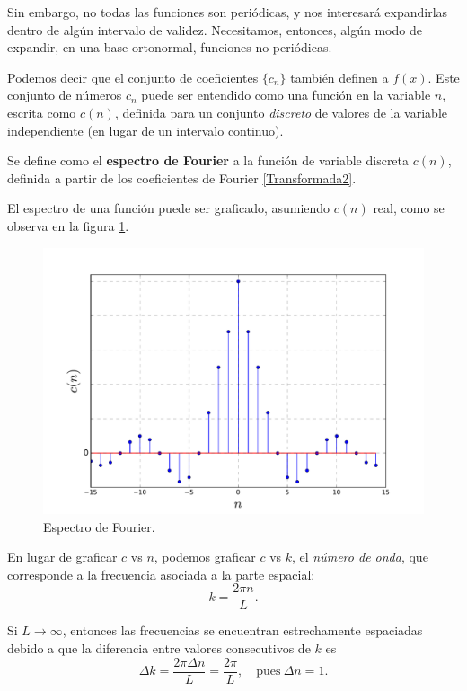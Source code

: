 Sin embargo, no todas las funciones son periódicas, y nos interesará expandirlas dentro de algún intervalo de validez. Necesitamos, entonces, algún modo de expandir, en una base ortonormal, funciones no periódicas. 

Podemos decir que el conjunto de coeficientes $\{c_n\}$ también definen a $f(x)$. Este conjunto de números $c_n$ puede ser entendido como una función en la variable $n$, escrita como $c(n)$, definida para un conjunto \emph{discreto} de valores de la variable independiente (en lugar de un intervalo continuo).  
\begin{defi}
    Se define como el \textbf{espectro de Fourier} a la función de variable discreta $c(n)$, definida a partir de los coeficientes de Fourier \eqref{Transformada2}.
\end{defi}

El espectro de una función puede ser graficado, asumiendo $c(n)$ real, como se observa en la figura \ref{fig:espectro-fourier}.

\vspace{-0.5cm}
\begin{figure}[H]
    \centering
    \includegraphics[width = 12cm]{Figuras/Espectro1.pdf}
    \caption{Espectro de Fourier.}
    \label{fig:espectro-fourier}
\end{figure}

En lugar de graficar $c$ vs $n$, podemos graficar $c$ vs $k$, el \emph{número de onda}, que corresponde a la frecuencia asociada a la parte espacial:
$$k = \frac{2\pi n}{L}.$$

Si $L \to \infty$, entonces las frecuencias se encuentran estrechamente espaciadas debido a que la diferencia entre valores consecutivos de $k$ es
$$\Delta k = \frac{ 2\pi \Delta n}{L}  = \frac{2\pi}{L}, \quad \mbox{pues}~ \Delta n = 1.$$

